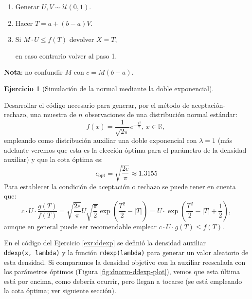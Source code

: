 \documentclass[
]{book}
\theoremstyle{break}
\theoremstyle{definition}
\theoremstyle{definition}
\theoremstyle{definition}
\newtheorem{exercise}{Ejercicio}[chapter]
\theoremstyle{definition}
\theoremstyle{remark}
\begin{document}
\begin{enumerate}
\def\labelenumi{\arabic{enumi}.}
\item
  Generar \(U,V\sim \mathcal{U}(0, 1)\).
\item
  Hacer \(T = a + \left( b-a \right) V\).
\item
  Si \(M \cdot U\leq f\left( T \right)\)
  devolver \(X = T\),

  en caso contrario volver al paso 1.
\end{enumerate}

\textbf{Nota}: no confundir \(M\) con \(c = M \left( b - a \right)\).

\begin{exercise}[Simulación de la normal mediante la doble exponencial]
\protect\hypertarget{exr:dnorm-ddexp-ar}{}{\label{exr:dnorm-ddexp-ar} {} }
\end{exercise}

Desarrollar el código necesario para generar, por el método de
aceptación-rechazo, una muestra de \(n\) observaciones de una
distribución normal estándar:
\[f(x)  =\frac{1}{\sqrt{2\pi}}e^{-\frac{x^{2}}{2}}\text{, }x\in\mathbb{R}\text{, }\]
empleando como distribución auxiliar una doble exponencial con \(\lambda=1\)
(más adelante veremos que esta es la elección óptima para el parámetro de la densidad auxiliar) y que la cota óptima es:
\[c_{\text{opt}}=\sqrt{\frac{2e}{\pi}} \approx 1.3155\]
Para establecer la condición de aceptación o rechazo se puede tener en cuenta que:
\[c\cdot U\cdot\frac{g\left( T\right)  }{f\left( T\right)  }=\sqrt{\frac
{2e}{\pi}}U\sqrt{\frac{\pi}{2}}\exp\left( \frac{T^{2}}{2}-\left\vert
T\right\vert \right)  =U\cdot\exp\left( \frac{T^{2}}{2}-\left\vert
T\right\vert +\frac{1}{2}\right) ,\]
aunque en general puede ser recomendable emplear
\(c\cdot U\cdot g\left( T\right) \leq f\left( T\right)\).

En el código del Ejercicio \ref{exr:ddexp} se definió la densidad auxiliar \texttt{ddexp(x,\ lambda)} y la función \texttt{rdexp(lambda)} para generar un valor aleatorio de esta densidad.
Si comparamos la densidad objetivo con la auxiliar reescalada con los parámetros óptimos (Figura \ref{fig:dnorm-ddexp-plot}), vemos que esta última está por encima, como debería ocurrir, pero llegan a tocarse (se está empleando la cota óptima; ver siguiente sección).
\end{document}
